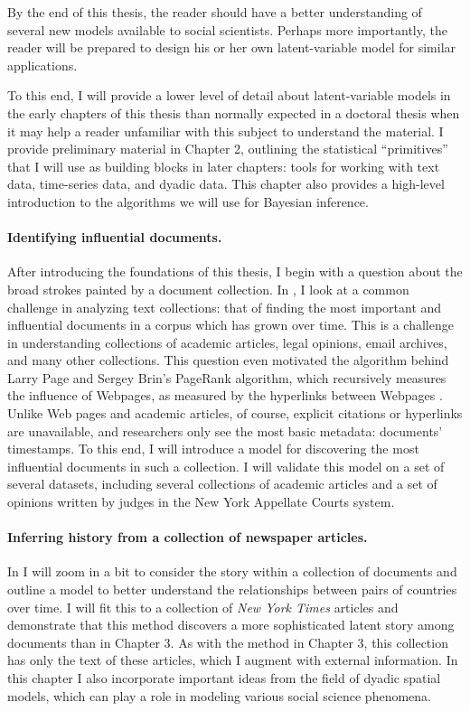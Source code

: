 By the end of this thesis, the reader should have a better
understanding of several new models available to social scientists.
Perhaps more importantly, the reader will be prepared to design his or
her own latent-variable model for similar applications.

To this end, I will provide a lower level of detail about
latent-variable models in the early chapters of this thesis than
normally expected in a doctoral thesis when it may help a reader
unfamiliar with this subject to understand the material.  I provide
preliminary material in Chapter 2, outlining the statistical
``primitives'' that I will use as building blocks in later chapters:
tools for working with text data, time-series data, and dyadic data.
This chapter also provides a high-level introduction to the algorithms
we will use for Bayesian inference.

\paragraph{Identifying influential documents.} After introducing the
foundations of this thesis, I begin with a question about the broad
strokes painted by a document collection. In , I
look at a common challenge in analyzing text collections: that of
finding the most important and influential documents in a corpus which
has grown over time.  This is a challenge in understanding collections
of academic articles, legal opinions, email archives, and many other
collections. This question even motivated the algorithm behind Larry
Page and Sergey Brin's PageRank algorithm, which recursively measures
the influence of Webpages, as measured by the hyperlinks between
Webpages \citep{garfield:1992,brin:1998,garfield:2002}.  Unlike Web
pages and academic articles, of course, explicit citations or
hyperlinks are unavailable, and researchers only see the most basic
metadata: documents' timestamps.  To this end, I will introduce a
model for discovering the most influential documents in such a
collection. I will validate this model on a set of several datasets,
including several collections of academic articles and a set of
opinions written by judges in the New York Appellate Courts system.

\paragraph{Inferring history from a collection of newspaper articles.}
In  I will zoom in a bit to consider the
story within a collection of documents and outline a model to better
understand the relationships between pairs of countries over time.  I
will fit this to a collection of \emph{New York Times} articles and
demonstrate that this method discovers a more sophisticated latent
story among documents than in Chapter 3.  As with the method in Chapter
3, this collection has only the text of these articles, which I
augment with external information.  In this chapter I also incorporate
important ideas from the field of dyadic spatial models, which can
play a role in modeling various social science phenomena.


